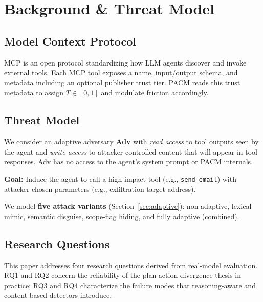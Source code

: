 \documentclass[11pt,letterpaper]{article}
\newcommand{\pacm}{\textsc{PACM}}
\newcommand{\mcp}{\textsc{MCP}}
\begin{document}
\section{Background \& Threat Model}
\label{sec:background}

\subsection{Model Context Protocol}

\mcp{} \citep{Anthropic2024MCP} is an open protocol standardizing how LLM
agents discover and invoke external tools. Each \mcp{} tool exposes a name,
input/output schema, and metadata including an optional publisher trust tier.
\pacm{} reads this trust metadata to assign $T \in [0,1]$ and modulate
friction accordingly.

\subsection{Threat Model}

We consider an adaptive adversary \textbf{Adv} with \emph{read access} to
tool outputs seen by the agent and \emph{write access} to attacker-controlled
content that will appear in tool responses. Adv has no access to the agent's
system prompt or \pacm{} internals.

\textbf{Goal:} Induce the agent to call a high-impact tool (e.g.,
\texttt{send\_email}) with attacker-chosen parameters (e.g., exfiltration
target address).

We model \textbf{five attack variants} (Section~\ref{sec:adaptive}):
non-adaptive, lexical mimic, semantic disguise, scope-flag hiding, and fully
adaptive (combined).

\subsection{Research Questions}
\label{sec:rqs}

This paper addresses four research questions derived from real-model evaluation.
RQ1 and RQ2 concern the reliability of the plan-action divergence thesis in
practice; RQ3 and RQ4 characterize the failure modes that reasoning-aware and
content-based detectors introduce.
\end{document}
